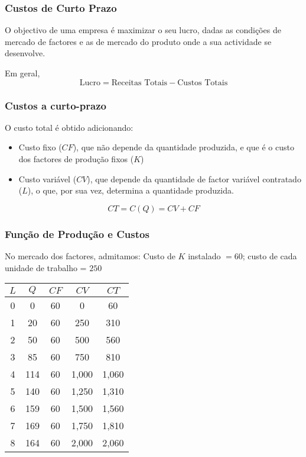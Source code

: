 \begin{frame}
	\frametitle{Custos de Curto Prazo}

	O objectivo de uma empresa \'e maximizar o seu lucro, dadas as condi\c c\~oes de mercado de factores e as de mercado do produto onde a sua actividade se desenvolve. \pause

	\vspace{1cm}

	Em geral, \[\text{Lucro}=\text{Receitas Totais}-\text{Custos Totais}\]
	
\end{frame}

\begin{frame}
	\frametitle{Custos a curto-prazo}
	O custo total \'e obtido adicionando:
	\begin{itemize}
		\item Custo fixo (\(CF\)), que n\~ao depende da quantidade produzida, e que \'e o custo dos factores de produ\c c\~ao fixos (\(K\))
		\item Custo vari\'avel (\(CV\)), que depende da quantidade de factor vari\'avel contratado (\(L\)), o que, por sua vez, determina a quantidade produzida.
	\end{itemize}
	\[CT = C(Q) = CV + CF\]

\end{frame}

\begin{frame}
	\frametitle{Fun\c c\~ao de Produ\c c\~ao e Custos}
	No mercado dos factores, admitamos: Custo de $K$ instalado $=60$; custo de cada unidade de trabalho = $250$

	\begin{center}
		\begin{tabular}{ccccc}
			$L$ & $Q$ & $CF$ & $CV$ & $CT$ \\ \hline \hline
			0 & 0 & 60 & 0 & 60 \\
			1 & 20 & 60 & 250 & 310 \\
			2 & 50 & 60 & 500 & 560 \\
			3 & 85 & 60 & 750 & 810 \\
			4 & 114 & 60 & 1,000 & 1,060 \\
			5 & 140 & 60 & 1,250 & 1,310 \\
			6 & 159 & 60 & 1,500 & 1,560 \\
			7 & 169 & 60 & 1,750 & 1,810 \\
			8 & 164 & 60 & 2,000 & 2,060
		\end{tabular}
	\end{center}
\end{frame}

